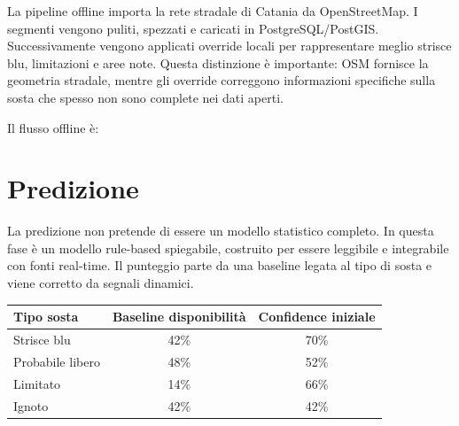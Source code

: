 \documentclass[11pt,a4paper]{article}
\begin{document}
La pipeline offline importa la rete stradale di Catania da OpenStreetMap. I segmenti vengono puliti, spezzati e caricati in PostgreSQL/PostGIS. Successivamente vengono applicati override locali per rappresentare meglio strisce blu, limitazioni e aree note. Questa distinzione \`e importante: OSM fornisce la geometria stradale, mentre gli override correggono informazioni specifiche sulla sosta che spesso non sono complete nei dati aperti.

Il flusso offline \`e:

\begin{center}
\end{center}

\section{Predizione}

La predizione non pretende di essere un modello statistico completo. In questa fase \`e un modello rule-based spiegabile, costruito per essere leggibile e integrabile con fonti real-time. Il punteggio parte da una baseline legata al tipo di sosta e viene corretto da segnali dinamici.

\begin{center}
\begin{tabular}{@{}lcc@{}}
\toprule
Tipo sosta & Baseline disponibilit\`a & Confidence iniziale \\
\midrule
Strisce blu & 42\% & 70\% \\
Probabile libero & 48\% & 52\% \\
Limitato & 14\% & 66\% \\
Ignoto & 42\% & 42\% \\
\bottomrule
\end{tabular}
\end{center}
\end{document}
